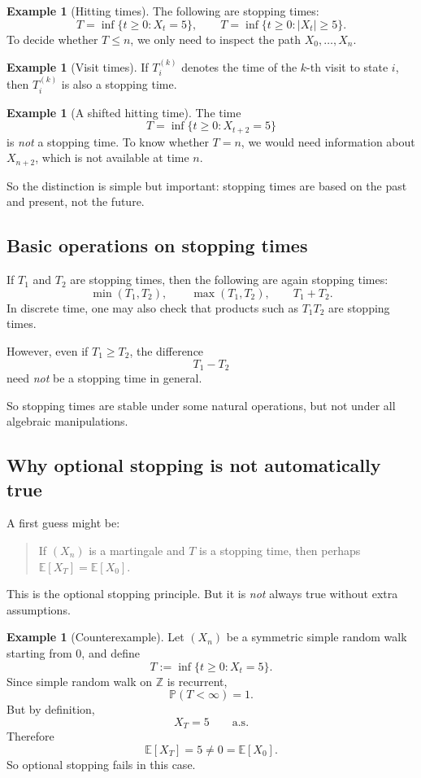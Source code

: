 \documentclass[11pt]{article}
\theoremstyle{definition}
\newtheorem{example}[theorem]{Example}
\begin{document}
\begin{example}[Hitting times]
The following are stopping times:
\[
T=\inf\{t\ge 0:X_t=5\},
\qquad
T=\inf\{t\ge 0:|X_t|\ge 5\}.
\]
To decide whether \(T\le n\), we only need to inspect the path \(X_0,\dots,X_n\).
\end{example}

\begin{example}[Visit times]
If \(T_i^{(k)}\) denotes the time of the \(k\)-th visit to state \(i\), then \(T_i^{(k)}\) is also a stopping time.
\end{example}

\begin{example}[A shifted hitting time]
The time
\[
T=\inf\{t\ge 0:X_{t+2}=5\}
\]
is \emph{not} a stopping time.
To know whether \(T=n\), we would need information about \(X_{n+2}\), which is not available at time \(n\).
\end{example}

So the distinction is simple but important: stopping times are based on the past and present, not the future.

\subsection{Basic operations on stopping times}

If \(T_1\) and \(T_2\) are stopping times, then the following are again stopping times:
\[
\min(T_1,T_2),
\qquad
\max(T_1,T_2),
\qquad
T_1+T_2.
\]
In discrete time, one may also check that products such as \(T_1T_2\) are stopping times.

However, even if \(T_1\ge T_2\), the difference
\[
T_1-T_2
\]
need \emph{not} be a stopping time in general.

So stopping times are stable under some natural operations, but not under all algebraic manipulations.

\subsection{Why optional stopping is not automatically true}

A first guess might be:
\begin{quote}
If \((X_n)\) is a martingale and \(T\) is a stopping time, then perhaps
\(\mathbb E[X_T]=\mathbb E[X_0]\).
\end{quote}
This is the optional stopping principle. But it is \emph{not} always true without extra assumptions.

\begin{example}[Counterexample]
Let \((X_n)\) be a symmetric simple random walk starting from \(0\), and define
\[
T:=\inf\{t\ge 0:X_t=5\}.
\]
Since simple random walk on \(\mathbb Z\) is recurrent,
\[
\mathbb P(T<\infty)=1.
\]
But by definition,
\[
X_T=5
\qquad \text{a.s.}
\]
Therefore
\[
\mathbb E[X_T]=5\neq 0=\mathbb E[X_0].
\]
So optional stopping fails in this case.
\end{example}
\end{document}
